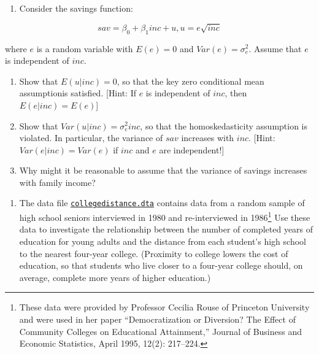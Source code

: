 \documentclass[
]{article}
\providecommand{\tightlist}{%
  \setlength{\itemsep}{0pt}\setlength{\parskip}{0pt}}
\begin{document}
\begin{enumerate}
\def\labelenumi{\arabic{enumi}.}
\setcounter{enumi}{2}
\tightlist
\item
  Consider the savings function:
\end{enumerate}

\[sav =  \beta_0 + \beta_1 inc + u, u = e\sqrt{inc}\]

where \(e\) is a random variable with \(E(e) = 0\) and
\(Var(e) = \sigma^2_e\). Assume that \(e\) is independent of \(inc\).

\begin{enumerate}
\def\labelenumi{\alph{enumi}.}
\tightlist
\item
  Show that \(E(u|inc)=0\), so that the key zero conditional mean
  assumptionis satisfied. {[}Hint: If \(e\) is independent of \(inc\),
  then \(E(e|inc) = E(e)\){]}
\item
  Show that \(Var(u|inc) = \sigma^2_einc\), so that the homoskedasticity
  assumption is violated. In particular, the variance of \(sav\)
  increases with \(inc\). {[}Hint: \(Var(e|inc) = Var(e)\) if \(inc\)
  and \(e\) are independent!{]}
\item
  Why might it be reasonable to assume that the variance of savings
  increases with family income?
\end{enumerate}

\begin{enumerate}
\def\labelenumi{\arabic{enumi}.}
\setcounter{enumi}{3}
\tightlist
\item
  The data file
  \href{../collegedistance.dta}{\texttt{collegedistance.dta}} contains
  data from a random sample of high school seniors interviewed in 1980
  and re-interviewed in 1986\footnote{These data were provided by
    Professor Cecilia Rouse of Princeton University and were used in her
    paper ``Democratization or Diversion? The Effect of Community
    Colleges on Educational Attainment,'' Journal of Business and
    Economic Statistics, April 1995, 12(2): 217--224.} Use these data to
  investigate the relationship between the number of completed years of
  education for young adults and the distance from each student's high
  school to the nearest four-year college. (Proximity to college lowers
  the cost of education, so that students who live closer to a four-year
  college should, on average, complete more years of higher education.)
\end{enumerate}
\end{document}
